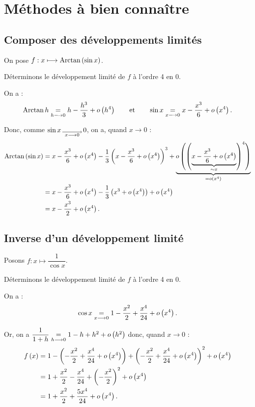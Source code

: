 \section{Méthodes à bien connaître}

\subsection{Composer des développements limités}

\begin{ex}
On pose \(f:x\longmapsto\operatorname{Arctan}\left(\sin x\right)\).

Déterminons le développement limité de \(f\) à l'ordre 4 en \(0\).

On a : \[\operatorname{Arctan} h\underset{h\longrightarrow0}{=}h-\dfrac{h^3}{3}+o\left(h^4\right)\qquad\text{et}\qquad\sin x\underset{x\longrightarrow0}{=}x-\dfrac{x^3}{6}+o\left(x^4\right).\]

Donc, comme \(\sin x\tendqd{x\to0}0\), on a, quand \(x\to0\) : \[\begin{aligned}
\operatorname{Arctan}\left(\sin x\right)&=x-\dfrac{x^3}{6}+o\left(x^4\right)-\dfrac{1}{3}\left(x-\dfrac{x^3}{6}+o\left(x^4\right)\right)^3+\underbrace{o\left(\left(\underbrace{x-\dfrac{x^3}{6}+o\left(x^4\right)}_{\sim x}\right)^4\right)}_{=o\left(x^4\right)} \\
&=x-\dfrac{x^3}{6}+o\left(x^4\right)-\dfrac{1}{3}\left(x^3+o\left(x^4\right)\right)+o\left(x^4\right) \\
&=x-\dfrac{x^3}{2}+o\left(x^4\right).
\end{aligned}\]
\end{ex}

\subsection{Inverse d'un développement limité}

\begin{ex}
Posons \(f:x\mapsto\dfrac{1}{\cos x}\).

Déterminons le développement limité de \(f\) à l'ordre 4 en \(0\).

On a : \[\cos x\underset{x\longrightarrow0}{=}1-\dfrac{x^2}{2}+\dfrac{x^4}{24}+o\left(x^4\right).\]

Or, on a \(\dfrac{1}{1+h}\underset{h\longrightarrow0}{=}1-h+h^2+o\left(h^2\right)\) donc, quand \(x\to0\) : \[\begin{aligned}
f\left(x\right)&=1-\left(-\dfrac{x^2}{2}+\dfrac{x^4}{24}+o\left(x^4\right)\right)+\left(-\dfrac{x^2}{2}+\dfrac{x^4}{24}+o\left(x^4\right)\right)^2+o\left(x^4\right) \\
&=1+\dfrac{x^2}{2}-\dfrac{x^4}{24}+\left(-\dfrac{x^2}{2}\right)^2+o\left(x^4\right) \\
&=1+\dfrac{x^2}{2}+\dfrac{5x^4}{24}+o\left(x^4\right).
\end{aligned}\]
\end{ex}

